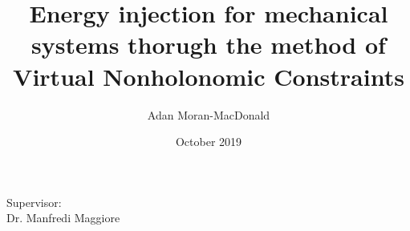 
\title{Energy injection for mechanical systems thorugh the method of Virtual Nonholonomic Constraints}
\author{Adan Moran-MacDonald }
\date{October 2019}

\begin{titlepage}
    \maketitle

    \thispagestyle{empty}
    
    \begin{center}
        Supervisor: \\
        Dr. Manfredi Maggiore\\
    \end{center}
\end{titlepage}
